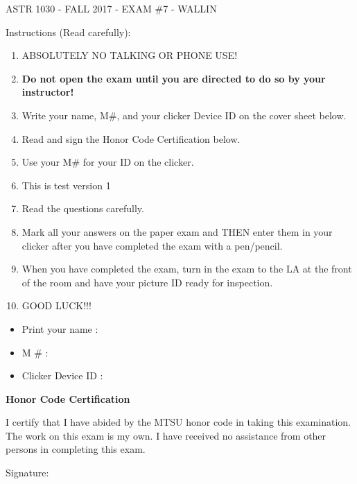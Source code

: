 \documentclass[11pt]{article}
\begin{document}
\pagebreak 
\setcounter{page}{1}
\vskip 0.1in 

\begin{center}ASTR 1030 - FALL 2017 - EXAM \#7 - WALLIN
\vskip 0.1in 

\end{center}
Instructions (Read carefully): 
\begin{enumerate}
\item ABSOLUTELY NO TALKING OR PHONE USE! 
\item {\bf Do not open the exam until you are directed to do so by your instructor!}
\item Write your name, M\#, and your clicker Device ID on the cover sheet below. 
\item Read and sign the Honor Code Certification below.
\item Use your M\# for your ID on the clicker.
\item This is test version 1
\item Read the questions carefully. 
\item Mark all your answers on the paper exam and THEN enter them in your clicker after you have completed the exam with a pen/pencil.
\item When you have completed the exam, turn in the exam to the LA at the front of the room and have your picture ID ready for inspection.
\item GOOD LUCK!!! 
\end{enumerate}
\hrulefill 
\vskip 0.1in 

\begin{itemize} \item Print your name :
\vskip 0.25in 


\item M \# :
\vskip 0.25in 

\item Clicker Device ID : 
\end{itemize} 
\vskip 0.5in 

{\bf Honor Code Certification}
\bigskip

I certify that I have abided by the MTSU honor code in taking this examination. The work
on this exam is my own. I have received no assistance from other persons in completing
this exam. 
\bigskip

Signature:


\pagebreak 
\end{document}

